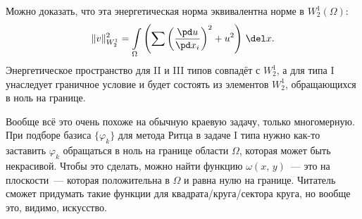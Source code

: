 \documentclass{trlnotes}
\begin{document}
    \begin{rem}
        Можно доказать, что эта энергетическая норма эквивалентна норме в $W_2^1(\Omega)$:
        \[
            \|v\|_{W_2^1}^2 = \int\limits_{\Omega} \left(\sum \left(\dfrac{\pd u}{\pd x_i}\right)^2 + u^2 \right) \, \del x.
        \]
        Энергетическое пространство для II и III типов совпадёт с $W_2^1$, а для типа I унаследует граничное условие и будет состоять из элементов $W_2^1$, обращающихся в ноль на границе.
    \end{rem}

    \begin{rem}
        Вообще всё это очень похоже на обычную краевую задачу, только многомерную. При подборе базиса $\{\varphi_k\}$ для метода Ритца в задаче I типа нужно как-то заставить $\varphi_k$ обращаться в ноль на границе области $\Omega$, которая может быть некрасивой. Чтобы это сделать, можно найти функцию $\omega(x, \, y)$~--- это на плоскости~--- которая положительна в $\Omega$ и равна нулю на границе. Читатель сможет придумать такие функции для квадрата/круга/сектора круга, но вообще это, видимо, искусство.
    \end{rem}
\end{document}
